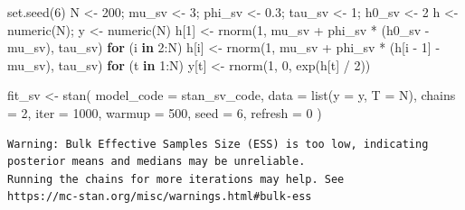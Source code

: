 \documentclass[
  letterpaper,
  DIV=11,
  numbers=noendperiod]{scrreprt}
\newenvironment{Shaded}{\begin{snugshade}}{\end{snugshade}}
\newcommand{\AttributeTok}[1]{\textcolor[rgb]{0.40,0.45,0.13}{#1}}
\newcommand{\ControlFlowTok}[1]{\textcolor[rgb]{0.00,0.23,0.31}{\textbf{#1}}}
\newcommand{\DecValTok}[1]{\textcolor[rgb]{0.68,0.00,0.00}{#1}}
\newcommand{\FloatTok}[1]{\textcolor[rgb]{0.68,0.00,0.00}{#1}}
\newcommand{\FunctionTok}[1]{\textcolor[rgb]{0.28,0.35,0.67}{#1}}
\newcommand{\NormalTok}[1]{\textcolor[rgb]{0.00,0.23,0.31}{#1}}
\newcommand{\OtherTok}[1]{\textcolor[rgb]{0.00,0.23,0.31}{#1}}
\newcommand{\SpecialCharTok}[1]{\textcolor[rgb]{0.37,0.37,0.37}{#1}}
\begin{document}
\begin{Shaded}
\begin{Highlighting}[]
\FunctionTok{set.seed}\NormalTok{(}\DecValTok{6}\NormalTok{)}
\NormalTok{N }\OtherTok{\textless{}{-}} \DecValTok{200}\NormalTok{; mu\_sv }\OtherTok{\textless{}{-}} \DecValTok{3}\NormalTok{; phi\_sv }\OtherTok{\textless{}{-}} \FloatTok{0.3}\NormalTok{; tau\_sv }\OtherTok{\textless{}{-}} \DecValTok{1}\NormalTok{; h0\_sv }\OtherTok{\textless{}{-}} \DecValTok{2}
\NormalTok{h }\OtherTok{\textless{}{-}} \FunctionTok{numeric}\NormalTok{(N); y }\OtherTok{\textless{}{-}} \FunctionTok{numeric}\NormalTok{(N)}
\NormalTok{h[}\DecValTok{1}\NormalTok{] }\OtherTok{\textless{}{-}} \FunctionTok{rnorm}\NormalTok{(}\DecValTok{1}\NormalTok{, mu\_sv }\SpecialCharTok{+}\NormalTok{ phi\_sv }\SpecialCharTok{*}\NormalTok{ (h0\_sv }\SpecialCharTok{{-}}\NormalTok{ mu\_sv), tau\_sv)}
\ControlFlowTok{for}\NormalTok{ (i }\ControlFlowTok{in} \DecValTok{2}\SpecialCharTok{:}\NormalTok{N) h[i] }\OtherTok{\textless{}{-}} \FunctionTok{rnorm}\NormalTok{(}\DecValTok{1}\NormalTok{, mu\_sv }\SpecialCharTok{+}\NormalTok{ phi\_sv }\SpecialCharTok{*}\NormalTok{ (h[i }\SpecialCharTok{{-}} \DecValTok{1}\NormalTok{] }\SpecialCharTok{{-}}\NormalTok{ mu\_sv), tau\_sv)}
\ControlFlowTok{for}\NormalTok{ (t }\ControlFlowTok{in} \DecValTok{1}\SpecialCharTok{:}\NormalTok{N) y[t] }\OtherTok{\textless{}{-}} \FunctionTok{rnorm}\NormalTok{(}\DecValTok{1}\NormalTok{, }\DecValTok{0}\NormalTok{, }\FunctionTok{exp}\NormalTok{(h[t] }\SpecialCharTok{/} \DecValTok{2}\NormalTok{))}

\NormalTok{fit\_sv }\OtherTok{\textless{}{-}} \FunctionTok{stan}\NormalTok{(}
    \AttributeTok{model\_code =}\NormalTok{ stan\_sv\_code, }\AttributeTok{data =} \FunctionTok{list}\NormalTok{(}\AttributeTok{y =}\NormalTok{ y, }\AttributeTok{T =}\NormalTok{ N),}
    \AttributeTok{chains =} \DecValTok{2}\NormalTok{, }\AttributeTok{iter =} \DecValTok{1000}\NormalTok{, }\AttributeTok{warmup =} \DecValTok{500}\NormalTok{, }\AttributeTok{seed =} \DecValTok{6}\NormalTok{, }\AttributeTok{refresh =} \DecValTok{0}
\NormalTok{)}
\end{Highlighting}
\end{Shaded}

\begin{verbatim}
Warning: Bulk Effective Samples Size (ESS) is too low, indicating posterior means and medians may be unreliable.
Running the chains for more iterations may help. See
https://mc-stan.org/misc/warnings.html#bulk-ess
\end{verbatim}
\end{document}

